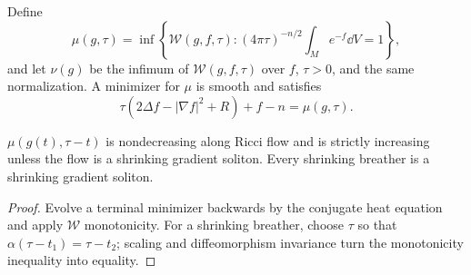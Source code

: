Define
\[
\mu(g,\tau)=\inf\left\{\mathcal W(g,f,\tau):
(4\pi\tau)^{-n/2}\int_Me^{-f}\dd V=1\right\},
\]
and let $\nu(g)$ be the infimum of $\mathcal W(g,f,\tau)$ over
$f$, $\tau>0$, and the same normalization.  A minimizer for $\mu$ is
smooth and satisfies \cite{Ro}
\[
\tau(2\Delta f-|\nabla f|^2+R)+f-n=\mu(g,\tau).
\]

\begin{corollary}
  \label{cor:cz-mu-monotonicity-and-shrinking-breathers}
$\mu(g(t),\tau-t)$ is nondecreasing along Ricci flow and is strictly
increasing unless the flow is a shrinking gradient soliton.  Every
shrinking breather is a shrinking gradient soliton.
\end{corollary}
\begin{proof}
\sketch Evolve a terminal minimizer backwards by the conjugate heat
equation and apply $\mathcal W$ monotonicity.  For a shrinking breather,
choose $\tau$ so that $\alpha(\tau-t_1)=\tau-t_2$; scaling and
diffeomorphism invariance turn the monotonicity inequality into equality.
\end{proof}
